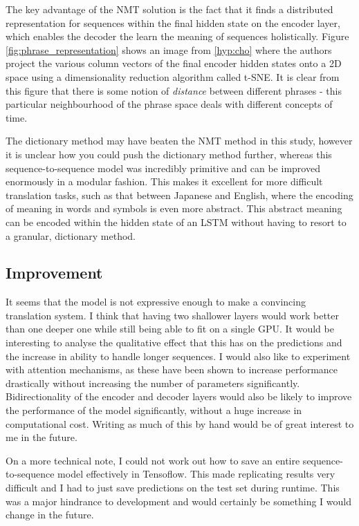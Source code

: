 \documentclass[]{article}
\begin{document}
The key advantage of the NMT solution is the fact that it finds a distributed representation for sequences within the final hidden state on the encoder layer, which enables the decoder the learn the meaning of sequences holistically. Figure \ref{fig:phrase_representation} shows an image from \ref{hyp:cho} where the authors project the various column vectors of the final encoder hidden states onto a 2D space using a dimensionality reduction algorithm called t-SNE. It is clear from this figure that there is some notion of \textit{distance} between different phrases - this particular neighbourhood of the phrase space deals with different concepts of time. 

The dictionary method may have beaten the NMT method in this study, however it is unclear how you could push the dictionary method further, whereas this sequence-to-sequence model was incredibly primitive and can be improved enormously in a modular fashion. This makes it excellent for more difficult translation tasks, such as that between Japanese and English, where the encoding of meaning in words and symbols is even more abstract. This abstract meaning can be encoded within the hidden state of an LSTM without having to resort to a granular, dictionary method.
\subsection{Improvement}
It seems that the model is not expressive enough to make a convincing translation system. I think that having two shallower layers would work better than one deeper one while still being able to fit on a single GPU. It would be interesting to analyse the qualitative effect that this has on the predictions and the increase in ability to handle longer sequences. I would also like to experiment with attention mechanisms, as these have been shown to increase performance drastically without increasing the number of parameters significantly. Bidirectionality of the encoder and decoder layers would also be likely to improve the performance of the model significantly, without a huge increase in computational cost. Writing as much of this by hand would be of great interest to me in the future.

On a more technical note, I could not work out how to save an entire sequence-to-sequence model effectively in Tensoflow. This made replicating results very difficult and I had to just save predictions on the test set during runtime. This was a major hindrance to development and would certainly be something I would change in the future.
\end{document}
